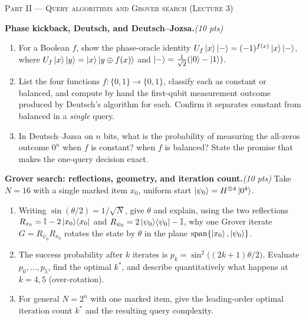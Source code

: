 \documentclass[11pt]{article}
\newcommand{\id}{\mathbb{I}}
\newcommand{\proj}[1]{\ket{#1}\!\bra{#1}}
\newcommand{\pts}[1]{\hfill{\normalfont\itshape(#1 pts)}}
\begin{document}
\bigskip
\noindent\textsc{Part II --- Query algorithms and Grover search (Lecture 3)}
\begin{problems}\setcounter{problemsi}{4}

\item \textbf{Phase kickback, Deutsch, and Deutsch--Jozsa.}\pts{10}
\begin{enumerate}[label=(\alph*),nosep,leftmargin=2em]
  \item For a Boolean $f$, show the phase-oracle identity
        $U_f\ket{x}\ket{-}=(-1)^{f(x)}\ket{x}\ket{-}$, where
        $U_f\ket{x}\ket{y}=\ket{x}\ket{y\oplus f(x)}$ and
        $\ket{-}=\tfrac{1}{\sqrt2}(\ket0-\ket1)$.
  \item List the four functions $f:\{0,1\}\to\{0,1\}$, classify each as constant or
        balanced, and compute by hand the first-qubit measurement outcome produced by
        Deutsch's algorithm for each. Confirm it separates constant from balanced in a
        \emph{single} query.
  \item In Deutsch--Jozsa on $n$ bits, what is the probability of measuring the
        all-zeros outcome $0^n$ when $f$ is constant? when $f$ is balanced? State the
        promise that makes the one-query decision exact.
\end{enumerate}

\item \textbf{Grover search: reflections, geometry, and iteration count.}\pts{10}
Take $N=16$ with a single marked item $x_0$, uniform start
$\ket{\psi_0}=H^{\otimes4}\ket{0^4}$.
\begin{enumerate}[label=(\alph*),nosep,leftmargin=2em]
  \item Writing $\sin(\theta/2)=1/\sqrt N$, give $\theta$ and explain, using the
        two reflections $R_{x_0}=\id-2\proj{x_0}$ and
        $R_{\psi_0}=2\proj{\psi_0}-\id$, why one Grover iterate
        $G=R_{\psi_0}R_{x_0}$ rotates the state by $\theta$ in the plane
        $\operatorname{span}\{\ket{x_0},\ket{\psi_0}\}$.
  \item The success probability after $k$ iterates is
        $p_k=\sin^2\!\bigl((2k+1)\theta/2\bigr)$. Evaluate $p_0,\dots,p_5$, find the
        optimal $k^\ast$, and describe quantitatively what happens at $k=4,5$
        (over-rotation).
  \item For general $N=2^n$ with one marked item, give the leading-order optimal
        iteration count $k^\ast$ and the resulting query complexity.
\end{enumerate}

\end{problems}
\end{document}
